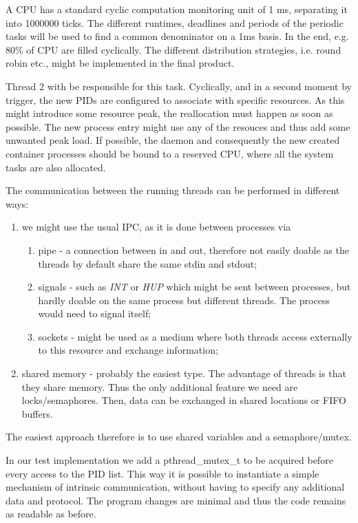 \documentclass[]{scrartcl}
\begin{document}
A CPU has a standard cyclic computation monitoring unit of 1 ms, separating it into 1000000 ticks. The different runtimes, deadlines and periods of the periodic tasks will be used to find a common denominator on a 1ms basis. 
In the end, e.g. 80\% of {CPU} are filled cyclically. 
The different distribution strategies, i.e. round robin etc., might be implemented in the final product.

Thread 2 with be responsible for this task. Cyclically, and in a second moment by trigger, the new PIDs are configured to associate with specific resources.
As this might introduce some resource peak, the reallocation must happen as soon as possible. 
The new process entry might use any of the resouces and thus add some unwanted peak load. 
If possible, the daemon and consequently the new created container processes should be bound to a reserved {CPU}, where all the system tasks are also allocated.


The communication between the running threads can be performed in different ways:

\begin{enumerate}
	\item we might use the usual IPC, as it is done between processes via
	\begin{enumerate}
		\item pipe - a connection between in and out, therefore not easily doable as the threads by default share the same stdin and stdout;
		\item signals - such as \textit{INT} or \textit{HUP} which might be sent between processes, but hardly doable on the same process but different threads. The process would need to signal itself;
		\item sockets - might be used as a medium where both threads access externally to this resource and exchange information;
	\end{enumerate}
	\item shared memory - probably the easiest type. The advantage of threads is that they 
	share memory. Thus the only additional feature we need are locks/semaphores. Then, data can be exchanged in shared locations or FIFO buffers.
\end{enumerate}
The easiest approach therefore is to use shared variables and a semaphore/mutex.

In our test implementation we add a pthread\_mutex\_t to be acquired before every access to the PID list.
This way it is possible to instantiate a simple mechanism of intrinsic communication, without having to specify any additional data and protocol.
The program changes are minimal and thus the code remains as readable as before.
\end{document}
